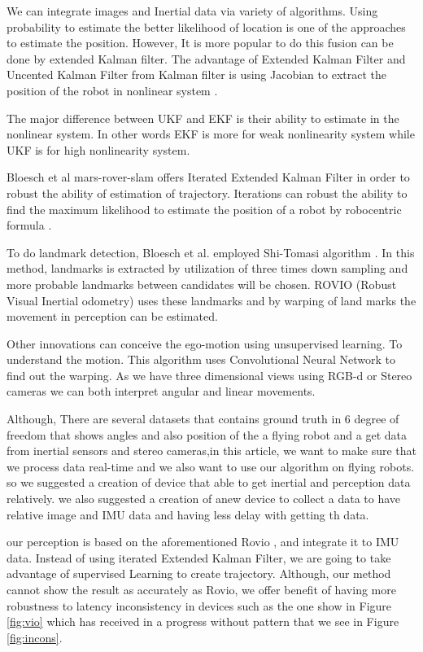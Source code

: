 \documentclass[a4paper,twoside]{article}
\begin{document}
We can integrate images and Inertial data via variety of algorithms. Using probability to estimate the better likelihood of location\cite{bowman2017probabilistic} is one of the approaches to estimate the position. However, It is more popular to do this fusion can be done by extended Kalman filter\cite{lynen2013robust}. The advantage of Extended Kalman Filter and Uncented Kalman Filter from Kalman filter is using Jacobian to extract the position of the robot in nonlinear system \cite{julier2004unscented,wan2000unscented}.

 The major difference between UKF and EKF is their ability to estimate in the nonlinear system. In other words EKF is more for weak nonlinearity system while UKF is for high nonlinearity system. \cite{st2004comparison}
 
Bloesch et al \cite{rovio15,rovio17}mars-rover-slam  offers Iterated Extended Kalman Filter in order to robust the ability of estimation of trajectory. Iterations can robust the ability to find the maximum likelihood to estimate the position of a robot by robocentric formula \cite{rovio15,rovio17}. 


To do landmark detection, Bloesch et al.  employed Shi-Tomasi algorithm \cite{shi1993good}. In this method, landmarks is extracted by utilization of three times down sampling and more probable landmarks between candidates will be chosen. ROVIO (Robust Visual Inertial odometry) uses these landmarks and by warping of land marks the movement in perception can be estimated.

Other innovations can conceive the ego-motion \cite{zhou2017unsupervised} using unsupervised learning. To understand the motion. This algorithm uses Convolutional Neural Network to find out the warping. As we have three dimensional views using RGB-d or Stereo cameras we can both interpret angular and linear movements.

Although, There are several datasets that contains ground truth in 6 degree of freedom that shows angles and also position of the a flying robot and a get data from inertial sensors and stereo cameras\cite{euroc},in this article, we want to make sure that we process data real-time and we also want to use our algorithm on flying robots. so we suggested a creation of device that able to get inertial and perception data relatively. we also suggested a creation of anew device to collect a data to have relative image and IMU data and having less delay with getting th data.

 our perception is based on the aforementioned Rovio \cite{rovio17}, and integrate it to IMU data.  Instead of using iterated Extended Kalman Filter, we are going to take advantage of supervised Learning  to create trajectory.
 Although, our method cannot show the result as accurately as Rovio, we offer benefit of having more robustness to latency inconsistency in devices such as the one show in Figure \ref{fig:vio} which has received in a progress without pattern that we see in Figure \ref{fig:incons}. 
 
\end{document}

